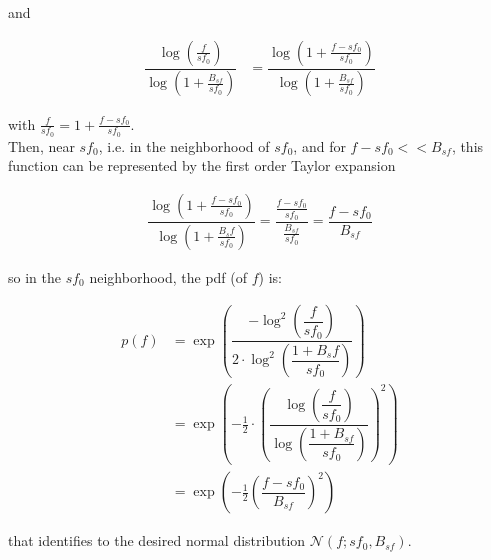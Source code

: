 \documentclass[a4paper,11pt]{article}%
\begin{document}
and
 
\begin{align}
 \dfrac{\log \left(\frac{f}{sf_{0}}\right)}{\log\left(1+\frac{B_{sf}}{sf_{0}}\right)}&= \dfrac{\log\left(1 + \frac{f-sf_{0}}{sf_{0}}\right)}{\log\left(1+\frac{B_{sf}}{sf_{0}}\right)}
\end{align}

 with $\frac{f}{sf_{0}}=1 + \frac{f-sf_{0}}{sf_{0}}$.\\
 Then, near $sf_{0}$, i.e. in the neighborhood of $sf_{0}$, and for $f-sf_{0} << B_{sf}$, this function can be represented by the first order Taylor expansion  
 
\begin{align}
 \dfrac{\log\left(1 + \frac{f-sf_{0}}{sf_{0}}\right)}{\log\left(1+\frac{B_sf}{sf_{0}}\right)}  =  \dfrac{\frac{f-sf_{0}}{{sf_{0}}}}{\frac{B_{sf}}{sf_{0}}} = \dfrac{f -sf_{0}}{B_{sf}}
\end{align}

 so in the  $sf_{0}$ neighborhood, the pdf (of $f$) is:

 \begin{align}
 p(f) &=  \exp \left(\dfrac{-\log^{2}\left(\dfrac{f}{sf_{0}}\right)}{2\cdot \log^{2} \left( \dfrac{1+B_sf}{sf_{0}}\right)}\right) \\
    &=  \exp\left(- \frac{1}{2} \cdot \left( \dfrac{\log\left(\dfrac{f}{sf_{0}}\right)}{\log\left(\dfrac{1+B_{sf}}{sf_{0}}\right)}\right)^{2} \right) \\
    &=  \exp\left(- \frac{1}{2} \left(\dfrac{f -sf_{0}}{B_{sf}}  \right)^{2} \right)
\end{align}

that identifies to the desired normal distribution $\mathcal{N}(f ; sf_{0}, B_{sf})$.


\end{document}
